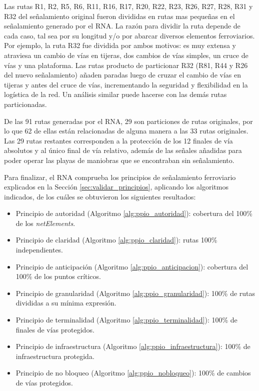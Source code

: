     Las rutas R1, R2, R5, R6, R11, R16, R17, R20, R22, R23, R26, R27, R28, R31 y R32 del señalamiento original fueron divididas en rutas mas pequeñas en el señalamiento generado por el RNA. La razón para dividir la ruta depende de cada caso, tal sea por su longitud y/o por abarcar diversos elementos ferroviarios. Por ejemplo, la ruta R32 fue dividida por ambos motivos: es muy extensa y atraviesa un cambio de vías en tijeras, dos cambios de vías simples, un cruce de vías y una plataforma. Las rutas producto de particionar R32 (R81, R44 y R26 del nuevo señalamiento) añaden paradas luego de cruzar el cambio de vías en tijeras y antes del cruce de vías, incrementando la seguridad y flexibilidad en la logística de la red. Un análisis similar puede hacerse con las demás rutas particionadas.
    
    De las 91 rutas generadas por el RNA, 29 son particiones de rutas originales, por lo que 62 de ellas están relacionadas de alguna manera a las 33 rutas originales. Las 29 rutas restantes corresponden a la protección de los 12 finales de vía absolutos y al único final de vía relativo, además de las señales añadidas para poder operar las playas de maniobras que se encontraban sin señalamiento.
    
    Para finalizar, el RNA comprueba los principios de señalamiento ferroviario explicados en la Sección \ref{sec:validar_principios}, aplicando los algoritmos indicados, de los cuáles se obtuvieron los siguientes resultados:
    
    \begin{itemize}
    	\item Principio de autoridad (Algoritmo \ref{alg:ppio_autoridad}): cobertura del 100\% de los \textit{netElements}.
    	\item Principio de claridad (Algoritmo \ref{alg:ppio_claridad}): rutas 100\% independientes.
    	\item Principio de anticipación (Algoritmo \ref{alg:ppio_anticipacion}): cobertura del 100\% de los puntos críticos.
    	\item Principio de granularidad (Algoritmo \ref{alg:ppio_granularidad}): 100\% de rutas divididas a su mínima expresión.
    	\item Principio de terminalidad (Algoritmo \ref{alg:ppio_terminalidad}): 100\% de finales de vías protegidos.
    	\item Principio de infraestructura (Algoritmo \ref{alg:ppio_infraestructura}): 100\% de infraestructura protegida.
    	\item Principio de no bloqueo (Algoritmo \ref{alg:ppio_nobloqueo}): 100\% de cambios de vías protegidos.
    \end{itemize}	